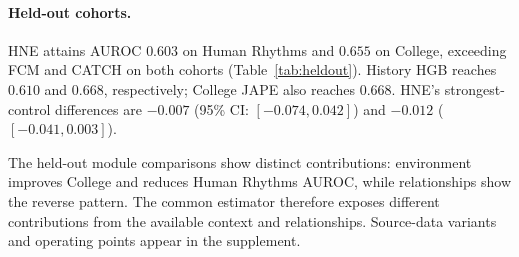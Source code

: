 

\paragraph{Held-out cohorts.}
\begin{table}[H]
\centering
\caption{Held-out AUROC on 2,948 Human Rhythms and 14,963 College origins. Neural methods average three seeds.}
\label{tab:heldout}
\end{table}

\begin{table}[t]
\centering
\caption{Frozen-source transfer. CARE and ESA use native fault and expert-event endpoints. Intervals resample people, assets, or spacecraft time blocks.}
\label{tab:transfer}
\end{table}

HNE attains AUROC $0.603$ on Human Rhythms and $0.655$ on College, exceeding FCM and CATCH on both cohorts (Table~\ref{tab:heldout}). History HGB reaches $0.610$ and $0.668$, respectively; College JAPE also reaches $0.668$. HNE's strongest-control differences are $-0.007$ (95\% CI: $[-0.074,0.042]$) and $-0.012$ ($[-0.041,0.003]$).

The held-out module comparisons show distinct contributions: environment improves College and reduces Human Rhythms AUROC, while relationships show the reverse pattern. The common estimator therefore exposes different contributions from the available context and relationships. Source-data variants and operating points appear in the supplement.
